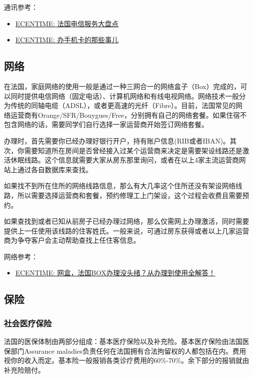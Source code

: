 通讯参考：
\begin{itemize}
    \item \href{https://www.ecentime.com/article/forfait-mobile-france}{ECENTIME: 法国电信服务大盘点}
    \item \href{https://www.ecentime.com/article/carte-sim}{ECENTIME: 办手机卡的那些事儿}
\end{itemize}

\subsection{网络}

在法国，家庭网络的使用一般是通过一种三网合一的网络盒子（Box）完成的，可以同时提供电信网络（固定电话）、计算机网络和有线电视网络。网络技术一般分为传统的同轴电缆（ADSL），或者更高速的光纤（Fibre）。目前，法国常见的网络运营商有Orange/SFR/Bouygues/Free，分别拥有自己的网络套餐。如果住宿不包含网络的话，需要同学们自行选择一家运营商开始签订网络套餐。

办理时，首先需要你已经办理好银行开户，持有账户信息(RIB或者IBAN)。其次，你需要知道所在房间是否曾经接入过某个运营商来决定是需要架设线路还是激活休眠线路。这个信息就需要大家从房东那里询问，或者在以上4家主流运营商网站上通过各自数据库来查找。

如果找不到所在住所的网络线路信息，那么有大几率这个住所还没有架设网络线路，所以需要选择运营商和套餐，预约修理工上门架设，这个过程会收费且需要预约。

如果查找到或者已知从前房子已经办理过网络，那么仅需网上办理激活，同时需要提供上一任使用该线路的住客姓氏。一般来说，可通过房东获得或者以上几家运营商为争夺客户会主动帮助查找上任住客信息。

网络参考：
\begin{itemize}
    \item \href{https://www.ecentime.com/article/network-box-in-france}{ECENTIME: 网盒，法国BOX办理没头绪？从办理到使用全解答！}
\end{itemize}

\subsection{保险}
\subsubsection{社会医疗保险}

法国的医保体制由两部分组成：基本医疗保险以及补充险。基本医疗保险由法国医保部门Assurance maladies负责任何在法国拥有合法拘留权的人都包括在内。费用视你的收入而定。基本险一般报销各类诊疗费用的60\%-70\%。余下部分的报销就由补充险赔付。

